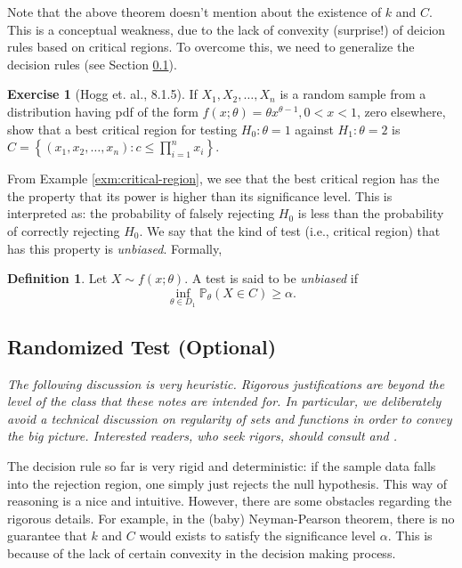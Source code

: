 \documentclass[
  openany]{book}
\theoremstyle{definition}
\newtheorem{definition}{Definition}[chapter]
\theoremstyle{definition}
\theoremstyle{definition}
\newtheorem{exercise}{Exercise}[chapter]
\theoremstyle{definition}
\theoremstyle{remark}
\begin{document}
\begin{bbox}
Note that the above theorem doesn't mention about the existence of \(k\) and \(C\).
This is a conceptual weakness, due to the lack of convexity (surprise!) of deicion rules
based on critical regions. To overcome this, we need to generalize the decision
rules (see Section \ref{random-test}).

\end{bbox}

\begin{exercise}[Hogg et. al., 8.1.5]
If \(X_1, X_2, \ldots, X_n\) is a random sample from a distribution having pdf of the form \(f(x ; \theta)=\theta x^{\theta-1}, 0<x<1\), zero elsewhere, show that a best critical region for testing \(H_0: \theta=1\) against \(H_1: \theta=2\) is \(C=\left\{\left(x_1, x_2, \ldots, x_n\right): c \leq \prod_{i=1}^n x_i\right\}\).
\end{exercise}

From Example \ref{exm:critical-region}, we see that the best critical region has the
the property that its power is higher than its significance level.
This is interpreted as: the probability of falsely rejecting \(H_0\) is less than
the probability of correctly rejecting \(H_0\).
We say that the kind of test (i.e., critical region) that has this property
is \emph{unbiased}. Formally,

\begin{definition}
Let \(X \sim f(x;\theta)\). A test is said to be \emph{unbiased} if
\[\inf_{\theta \in D_1} \mathbb{P}_{\theta} (X \in C) \geq \alpha.\]
\end{definition}

\subsection{Randomized Test (Optional)}\label{random-test}

\emph{The following discussion is very heuristic. Rigorous justifications
are beyond the level of the class that these notes are intended for.
In particular, we deliberately avoid a technical discussion on regularity of
sets and functions in order to convey the big picture.
Interested readers, who seek rigors, should consult \citep{keener2010theoretical} and \citep{lehmann2005testing}.}

The decision rule so far is very rigid and deterministic: if the sample data
falls into the rejection region, one simply just rejects the null hypothesis.
This way of reasoning is a nice and intuitive.
However, there are some obstacles regarding the rigorous details.
For example, in the (baby) Neyman-Pearson theorem, there is no guarantee that
\(k\) and \(C\) would exists to satisfy the significance level \(\alpha\).
This is because of the lack of certain convexity in the decision making process.
\end{document}
